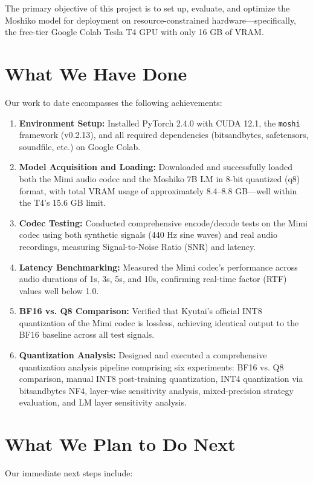 \documentclass[12pt,a4paper]{report}
\begin{document}
The primary objective of this project is to set up, evaluate, and optimize the Moshiko model for deployment on resource-constrained hardware---specifically, the free-tier Google Colab Tesla T4 GPU with only 16 GB of VRAM.

\section{What We Have Done}
Our work to date encompasses the following achievements:

\begin{enumerate}
    \item \textbf{Environment Setup:} Installed PyTorch 2.4.0 with CUDA 12.1, the \texttt{moshi} framework (v0.2.13), and all required dependencies (bitsandbytes, safetensors, soundfile, etc.) on Google Colab.
    
    \item \textbf{Model Acquisition and Loading:} Downloaded and successfully loaded both the Mimi audio codec and the Moshiko 7B LM in 8-bit quantized (q8) format, with total VRAM usage of approximately 8.4--8.8 GB---well within the T4's 15.6 GB limit.
    
    \item \textbf{Codec Testing:} Conducted comprehensive encode/decode tests on the Mimi codec using both synthetic signals (440 Hz sine waves) and real audio recordings, measuring Signal-to-Noise Ratio (SNR) and latency.
    
    \item \textbf{Latency Benchmarking:} Measured the Mimi codec's performance across audio durations of 1s, 3s, 5s, and 10s, confirming real-time factor (RTF) values well below 1.0.
    
    \item \textbf{BF16 vs. Q8 Comparison:} Verified that Kyutai's official INT8 quantization of the Mimi codec is lossless, achieving identical output to the BF16 baseline across all test signals.
    
    \item \textbf{Quantization Analysis:} Designed and executed a comprehensive quantization analysis pipeline comprising six experiments: BF16 vs. Q8 comparison, manual INT8 post-training quantization, INT4 quantization via bitsandbytes NF4, layer-wise sensitivity analysis, mixed-precision strategy evaluation, and LM layer sensitivity analysis.
\end{enumerate}

\section{What We Plan to Do Next}
Our immediate next steps include:
\end{document}
